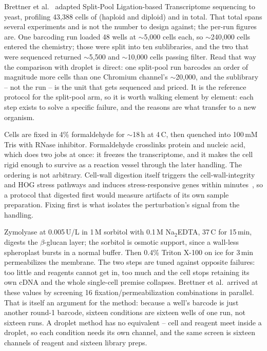 Brettner et al.\ \citep{brettnerUltraHighthroughputMassively2024} adapted Split-Pool Ligation-based
Transcriptome sequencing to yeast, profiling 43{,}388 cells of 
(haploid and diploid) and  in total. That total spans several
experiments and is not the number to design against; the per-run figures are.
One barcoding run loaded 48 wells at $\sim$5{,}000 cells each, so
$\sim$240{,}000 cells entered the chemistry; those were split into ten
sublibraries, and the two that were sequenced returned $\sim$5{,}500 and
$\sim$10{,}000 cells passing filter. Read that way the comparison with droplet is
direct: one split-pool run barcodes an order of magnitude more cells than one
Chromium channel's $\sim$20{,}000, and the sublibrary -- not the run -- is the
unit that gets sequenced and priced. It is the reference protocol for the
split-pool arm, so it is worth walking element by element: each step exists to
solve a specific failure, and the reasons are what transfer to a new organism.

 Cells are fixed in 4\% formaldehyde for
$\sim$18\,h at 4\,\textdegree C, then quenched into 100\,mM Tris with RNase
inhibitor. Formaldehyde crosslinks protein and nucleic acid, which does two jobs
at once: it freezes the transcriptome, and it makes the cell rigid enough to
survive as a reaction vessel through the later handling. The ordering is not
arbitrary. Cell-wall digestion itself triggers the cell-wall-integrity and HOG
stress pathways and induces stress-responsive genes within
minutes~\citep{nadal-ribellesRiseSinglecellTranscriptomics2024}, so a protocol
that digested first would measure artifacts of its own sample preparation.
Fixing first is what isolates the perturbation's signal from the handling.

 Zymolyase at
0.005\,U/\textmu L in 1\,M sorbitol with 0.1\,M Na$_2$EDTA, 37\,\textdegree C for
15\,min, digests the $\beta$-glucan layer; the sorbitol is osmotic support, since
a wall-less spheroplast bursts in a normal buffer. Then 0.4\% Triton X-100 on
ice for 3\,min permeabilizes the membrane. The two steps are tuned against
opposite failures: too little and reagents cannot get in, too much and the cell
stops retaining its own cDNA and the whole single-cell premise collapses. Brettner et al.\ arrived at these values by screening 16 fixation/permeabilization combinations in
parallel. That is itself an argument for the method: because a well's barcode is
just another round-1 barcode, sixteen conditions are sixteen wells of one run,
not sixteen runs. A droplet method has no equivalent -- cell and reagent meet
inside a droplet, so each condition needs its own channel, and the same screen is
sixteen channels of reagent and sixteen library preps.

